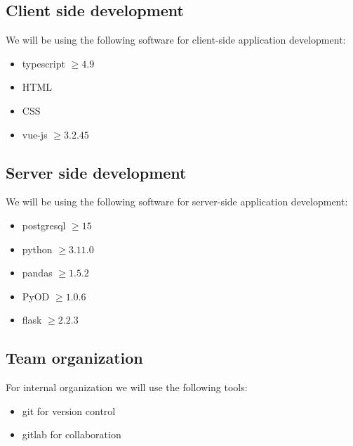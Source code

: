 \documentclass[11pt, english]{scrartcl}
\begin{document}
\subsection*{Client side development}
We will be using the following software for client-side application development:
\begin{itemize}
    \item \Gls{typescript} $\geq 4.9$
    \item \Gls{HTML}
    \item \Gls{CSS}
    \item \Gls{vue-js} $\geq 3.2.45$
\end{itemize}
\subsection*{Server side development}
We will be using the following software for server-side application development:
\begin{itemize}
    \item \Gls{postgresql} $\geq 15$
    \item \Gls{python} $\geq 3.11.0$
    \item \Gls{pandas} $\geq 1.5.2$
    \item \Gls{PyOD} $\geq 1.0.6$
    \item \Gls{flask} $\geq 2.2.3$
\end{itemize}

\subsection*{Team organization}
For internal organization we will use the following tools:
\begin{itemize}
    \item \Gls{git} for version control
    \item \Gls{gitlab} for collaboration
\end{itemize}

\pagebreak

\printglossary %
\pagebreak
\printglossary[type=\acronymtype] %
\end{document}
